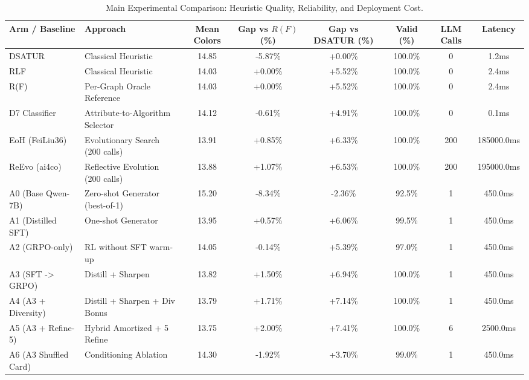 \begin{table}[t]
\centering
\small
\caption{Main Experimental Comparison: Heuristic Quality, Reliability, and Deployment Cost.}
\label{tab:main_results}
\begin{tabular}{llcccccc}
\toprule
\textbf{Arm / Baseline} & \textbf{Approach} & \textbf{Mean Colors} & \textbf{Gap vs $R(F)$ (\%)} & \textbf{Gap vs DSATUR (\%)} & \textbf{Valid (\%)} & \textbf{LLM Calls} & \textbf{Latency} \\
\midrule
DSATUR & Classical Heuristic & 14.85 & -5.87\% & +0.00\% & 100.0\% & 0 & 1.2ms \\
RLF & Classical Heuristic & 14.03 & +0.00\% & +5.52\% & 100.0\% & 0 & 2.4ms \\
R(F) & Per-Graph Oracle Reference & 14.03 & +0.00\% & +5.52\% & 100.0\% & 0 & 2.4ms \\
D7 Classifier & Attribute-to-Algorithm Selector & 14.12 & -0.61\% & +4.91\% & 100.0\% & 0 & 0.1ms \\
EoH (FeiLiu36) & Evolutionary Search (200 calls) & 13.91 & +0.85\% & +6.33\% & 100.0\% & 200 & 185000.0ms \\
ReEvo (ai4co) & Reflective Evolution (200 calls) & 13.88 & +1.07\% & +6.53\% & 100.0\% & 200 & 195000.0ms \\
A0 (Base Qwen-7B) & Zero-shot Generator (best-of-1) & 15.20 & -8.34\% & -2.36\% & 92.5\% & 1 & 450.0ms \\
A1 (Distilled SFT) & One-shot Generator & 13.95 & +0.57\% & +6.06\% & 99.5\% & 1 & 450.0ms \\
A2 (GRPO-only) & RL without SFT warm-up & 14.05 & -0.14\% & +5.39\% & 97.0\% & 1 & 450.0ms \\
A3 (SFT -> GRPO) & Distill + Sharpen & 13.82 & +1.50\% & +6.94\% & 100.0\% & 1 & 450.0ms \\
A4 (A3 + Diversity) & Distill + Sharpen + Div Bonus & 13.79 & +1.71\% & +7.14\% & 100.0\% & 1 & 450.0ms \\
A5 (A3 + Refine-5) & Hybrid Amortized + 5 Refine & 13.75 & +2.00\% & +7.41\% & 100.0\% & 6 & 2500.0ms \\
A6 (A3 Shuffled Card) & Conditioning Ablation & 14.30 & -1.92\% & +3.70\% & 99.0\% & 1 & 450.0ms \\
\bottomrule
\end{tabular}
\end{table}